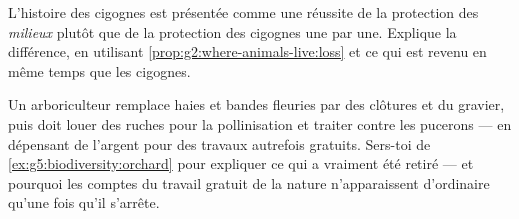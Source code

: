 \begin{exercise}[$\star\star$]\label{exo:g5:biodiversity:10}
L'histoire des cigognes est présentée comme une réussite de la
protection des \emph{milieux} plutôt que de la protection des
cigognes une par une. Explique la différence, en utilisant
\cref{prop:g2:where-animals-live:loss} et ce qui est revenu en même
temps que les cigognes.
\end{exercise}

\begin{exercise}[$\star\star\star$]\label{exo:g5:biodiversity:11}
Un arboriculteur remplace haies et bandes fleuries par des clôtures
et du gravier, puis doit louer des ruches pour la pollinisation et
traiter contre les pucerons --- en dépensant de l'argent pour des
travaux autrefois gratuits. Sers-toi de
\cref{ex:g5:biodiversity:orchard} pour expliquer ce qui a vraiment
été retiré --- et pourquoi les comptes du travail gratuit de la
nature n'apparaissent d'ordinaire qu'une fois qu'il s'arrête.
\end{exercise}
